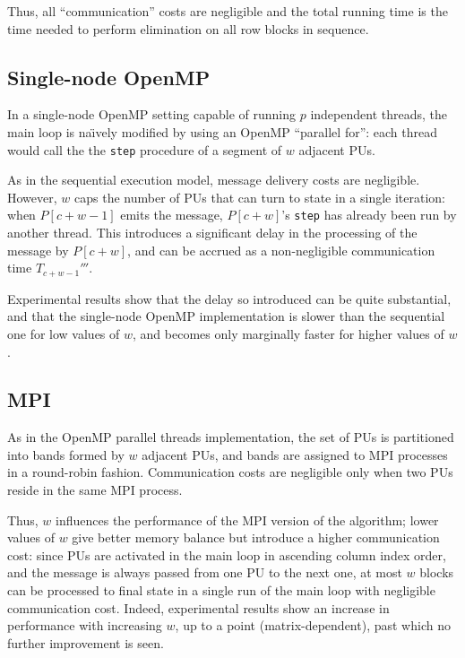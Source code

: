 Thus, all ``communication'' costs are negligible and the total running
time is the time needed to perform elimination on all row blocks in
sequence.


\subsection{Single-node OpenMP}
\label{sec:openmp-impl}

In a single-node OpenMP setting capable of running $p$ independent
threads, the main loop is na\"{\i}vely modified by using an OpenMP
``parallel for'': each thread would call the the \verb"step" procedure
of a segment of $w$ adjacent PUs.

As in the sequential execution model, message delivery costs are
negligible.  However, $w$ caps the number of PUs that can turn to
 state in a single iteration: when $P[c+w-1]$ emits the
 message, $P[c+w]$'s \verb"step" has already been run by
another thread.  This introduces a significant delay in the processing
of the  message by $P[c+w]$, and can be accrued as a
non-negligible communication time $T_{c+w-1}'''$.

Experimental results show that the delay so introduced can be quite
substantial, and that the single-node OpenMP implementation is slower
than the sequential one for low values of $w$, and becomes only
marginally faster for higher values of $w$.


\subsection{MPI}
\label{sec:mpi-impl}

As in the OpenMP parallel threads implementation, the set of PUs is
partitioned into bands formed by $w$ adjacent PUs, and bands are
assigned to MPI processes in a round-robin fashion.  Communication
costs are negligible only when two PUs reside in the same MPI
process. 

Thus, $w$ influences the performance of the MPI version of the
algorithm; lower values of $w$ give better memory balance but
introduce a higher communication cost: since PUs are activated in the
main loop in ascending column index order, and the  message is
always passed from one PU to the next one, at most $w$ blocks can be
processed to final state in a single run of the main loop with
negligible communication cost.  Indeed, experimental results show an
increase in performance with increasing $w$, up to a point
(matrix-dependent), past which no further improvement is seen.

